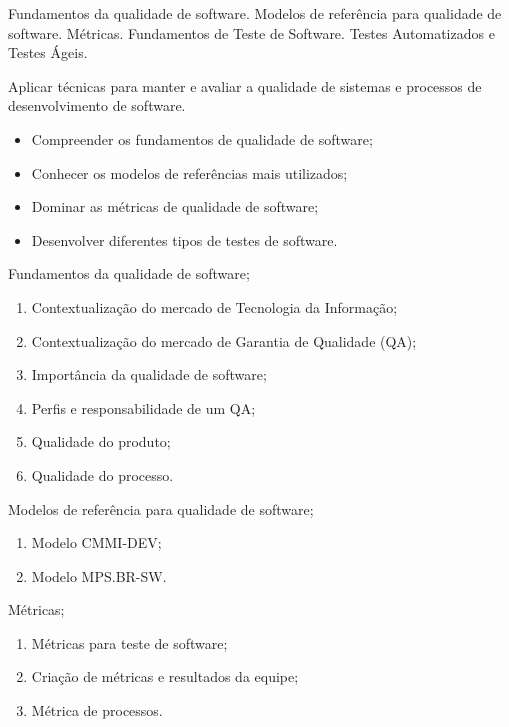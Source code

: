 \begin{pud}

	
	\ementa
	Fundamentos da qualidade de software. Modelos de referência para qualidade de
software. Métricas. Fundamentos de Teste de Software. Testes Automatizados e
Testes Ágeis.

	\objetivos
	Aplicar técnicas para manter e avaliar a qualidade de sistemas e processos de desenvolvimento de software.
	\begin{itemize}
	  \item Compreender os fundamentos de qualidade de software;
	  \item Conhecer os modelos de referências mais utilizados;
	  \item Dominar as métricas de qualidade de software;
	  \item Desenvolver diferentes tipos de testes de software.
	\end{itemize}
	
	\programa
	\begin{description}[itemsep=0em]
		\item[UNIDADE I:] Fundamentos da qualidade de software;
		\begin{enumerate}[itemsep=0em, topsep=0em]
			\item Contextualização do mercado de Tecnologia da Informação;
			\item Contextualização do mercado de Garantia de Qualidade (QA);
			\item Importância da qualidade de software;
			\item Perfis e responsabilidade de um QA;
			\item Qualidade do produto;
			\item Qualidade do processo.
		\end{enumerate}
		
		\item[UNIDADE II:] Modelos de referência para qualidade de software;
		\begin{enumerate}[itemsep=0em, topsep=0em]
			\item Modelo CMMI-DEV;
			\item Modelo MPS.BR-SW.
		\end{enumerate}
		
		\item[UNIDADE III:] Métricas;
		\begin{enumerate}[itemsep=0em, topsep=0em]
			\item Métricas para teste de software;
			\item Criação de métricas e resultados da equipe;
			\item Métrica de processos.
		\end{enumerate}
		

\end{description}
\end{pud}

